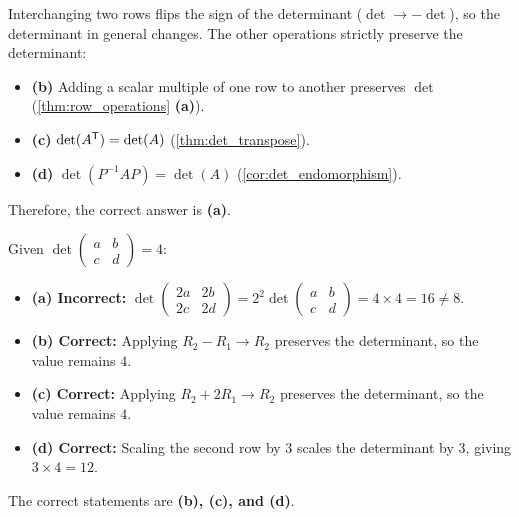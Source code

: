 \begin{exercisesolution*}
\label{sol:invariance_under_matrix_operations_sc}
Interchanging two rows flips the sign of the determinant ($\det \to -\det$), so the determinant in general changes.
The other operations strictly preserve the determinant:
\begin{itemize}
    \item \textbf{(b)} Adding a scalar multiple of one row to another preserves $\det$ (\cref{thm:row_operations} \textbf{(a)}).
    \item \textbf{(c)} $\det(A^{\mathsf{T}}) = \det(A)$ (\cref{thm:det_transpose}).
    \item \textbf{(d)} $\det(P^{-1}AP) = \det(A)$ (\cref{cor:det_endomorphism}).
\end{itemize}
Therefore, the correct answer is \textbf{(a)}.
\end{exercisesolution*}

\begin{exercisesolution*}
\label{sol:row_transformations_2x2_mc}
Given $\det \left(\begin{smallmatrix} a & b \\ c & d \end{smallmatrix}\right) = 4$:
\begin{itemize}
    \item \textbf{(a) Incorrect:} $\det \left(\begin{smallmatrix} 2a & 2b \\ 2c & 2d \end{smallmatrix}\right) = 2^2 \det \left(\begin{smallmatrix} a & b \\ c & d \end{smallmatrix}\right) = 4 \times 4 = 16 \ne 8$.
    \item \textbf{(b) Correct:} Applying $R_2 - R_1 \to R_2$ preserves the determinant, so the value remains $4$.
    \item \textbf{(c) Correct:} Applying $R_2 + 2R_1 \to R_2$ preserves the determinant, so the value remains $4$.
    \item \textbf{(d) Correct:} Scaling the second row by $3$ scales the determinant by $3$, giving $3 \times 4 = 12$.
\end{itemize}
The correct statements are \textbf{(b), (c), and (d)}.
\end{exercisesolution*}

